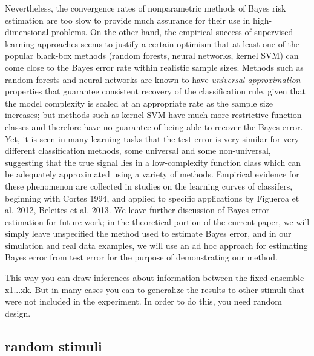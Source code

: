 \documentclass[12pt]{article}
\begin{document}
Nevertheless, the convergence rates of nonparametric methods of Bayes
risk estimation are too slow to provide much assurance for their use
in high-dimensional problems.  On the other hand, the empirical
success of supervised learning approaches seems to justify a certain
optimism that at least one of the popular black-box methods (random
forests, neural networks, kernel SVM) can come close to the Bayes
error rate within realistic sample sizes.  Methods such as random
forests and neural networks are known to have \emph{universal
approximation} properties that guarantee consistent recovery of the
classification rule, given that the model complexity is scaled at an
appropriate rate as the sample size increases; but methods such as
kernel SVM have much more restrictive function classes and therefore
have no guarantee of being able to recover the Bayes error.  Yet, it
is seen in many learning tasks that the test error is very similar for
very different classification methods, some universal and some
non-universal, suggesting that the true signal lies in a
low-complexity function class which can be adequately approximated
using a variety of methods.  Empirical evidence for these phenomenon
are collected in studies on the learning curves of classifers,
beginning with Cortes 1994, and applied to specific applications by
Figueroa et al. 2012, Beleites et al. 2013.  We leave further
discussion of Bayes error estimation for future work; in the
theoretical portion of the current paper, we will simply leave
unspecified the method used to estimate Bayes error, and in our
simulation and real data examples, we will use an ad hoc approach for
estimating Bayes error from test error for the purpose of
demonstrating our method.


This way you can draw inferences about information between the fixed ensemble x1...xk.
But in many cases you can to generalize the results to other stimuli that were not included in the experiment.
In order to do this, you need random design.

\subsection{random stimuli}
\end{document}
